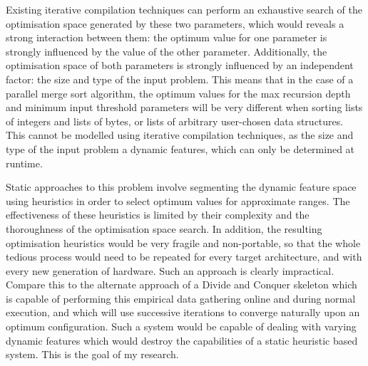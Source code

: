 Existing iterative compilation techniques can perform an exhaustive
search of the optimisation space generated by these two parameters,
which would reveals a strong interaction between them: the optimum
value for one parameter is strongly influenced by the value of the
other parameter. Additionally, the optimisation space of both
parameters is strongly influenced by an independent factor: the size
and type of the input problem. This means that in the case of a
parallel merge sort algorithm, the optimum values for the max
recursion depth and minimum input threshold parameters will be very
different when sorting lists of integers and lists of bytes, or lists
of arbitrary user-chosen data structures. This cannot be modelled
using iterative compilation techniques, as the size and type of the
input problem a dynamic features, which can only be determined at
runtime.

Static approaches to this problem involve segmenting the dynamic
feature space using heuristics in order to select optimum values for
approximate ranges. The effectiveness of these heuristics is limited
by their complexity and the thoroughness of the optimisation space
search. In addition, the resulting optimisation heuristics would be
very fragile and non-portable, so that the whole tedious process would
need to be repeated for every target architecture, and with every new
generation of hardware. Such an approach is clearly
impractical. Compare this to the alternate approach of a Divide and
Conquer skeleton which is capable of performing this empirical data
gathering online and during normal execution, and which will use
successive iterations to converge naturally upon an optimum
configuration. Such a system would be capable of dealing with varying
dynamic features which would destroy the capabilities of a static
heuristic based system. This is the goal of my research.
